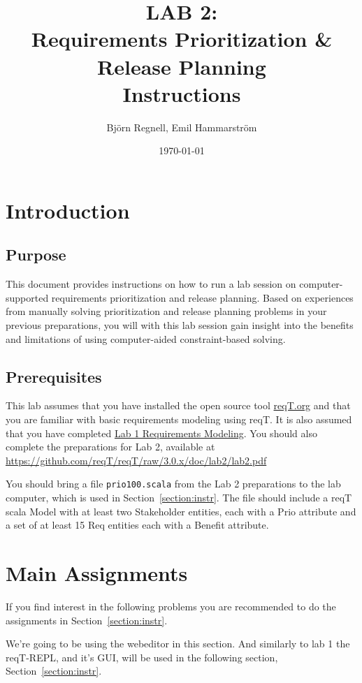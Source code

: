 \documentclass[11pt]{article}
\title{{\bf LAB 2:\\Requirements Prioritization \& Release Planning}\\ Instructions
}
\author{Björn Regnell, Emil Hammarström}
\date{\today}
\begin{document}
\maketitle

\section{Introduction}

\subsection{Purpose} This document provides instructions on how to run 
a lab session on computer-supported requirements prioritization and release planning. Based on experiences from manually solving prioritization and release planning problems in your previous preparations, you will with this lab session gain insight into the benefits and limitations of using computer-aided constraint-based solving. 

\subsection{Prerequisites} This lab assumes that you have installed the open source tool \href{http://reqT.org}{reqT.org} and that you are familiar with basic requirements modeling using reqT. It is also assumed that you have completed \href{https://github.com/reqT/reqT/raw/3.0.x/doc/lab1/lab1.pdf}{Lab 1 Requirements Modeling}. You should also complete the preparations for Lab 2, available at \url{https://github.com/reqT/reqT/raw/3.0.x/doc/lab2/lab2.pdf} 

You should bring a file \verb+prio100.scala+ from the Lab 2 preparations to the lab computer, which is used in Section~\ref{section:instr}. The file should include a reqT scala Model with at least two Stakeholder entities, each with a Prio attribute and a set of at least 15 Req entities each with a Benefit attribute.   

\clearpage\newpage
\section{Main Assignments}\label{section:main-instr}
If you find interest in the following problems you are recommended to do the assignments in Section~\ref{section:instr}.

We're going to be using the webeditor in this section. And similarly to lab 1 the reqT-REPL, and it's GUI, will be used in the following section, Section~\ref{section:instr}.
\end{document}
